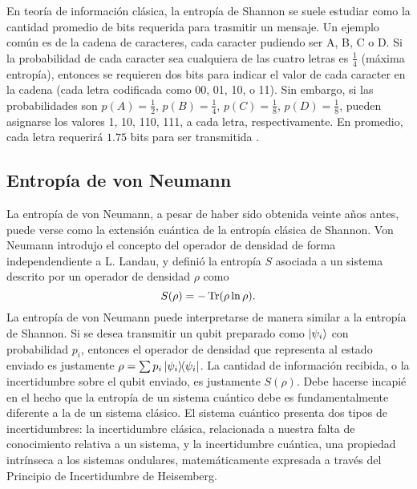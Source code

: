 En teoría de información clásica, la entropía de Shannon se suele estudiar como la cantidad promedio de bits requerida para trasmitir un mensaje. Un ejemplo común es de la cadena de caracteres, cada caracter pudiendo ser A, B, C o D. Si la probabilidad de cada caracter sea cualquiera de las cuatro letras es $\frac{1}{4}$ (máxima entropía), entonces se requieren dos bits para indicar el valor de cada caracter en la cadena (cada letra codificada como 00, 01, 10, o 11). Sin embargo, si las probabilidades son $p(A)=\frac{1}{2}$, $p(B)=\frac{1}{4}$, $p(C)=\frac{1}{8}$, $p(D)=\frac{1}{8}$, pueden asignarse los valores 1, 10, 110, 111, a cada letra, respectivamente. En promedio, cada letra requerirá $1.75$ bits para ser transmitida \cite{Chuang}. 

\subsection{Entropía de von Neumann}

La entropía de von Neumann, a pesar de haber sido obtenida veinte años antes, puede verse como la extensión cuántica de la entropía clásica de Shannon. Von Neumann introdujo el concepto del operador de densidad de forma independendiente a L. Landau, y definió la entropía $S$ asociada a un sistema descrito por un operador de densidad $\rho$ como \cite{vonNeumann}
\begin{equation}\label{eq:VonNeumannEntropy}
    S(\rho)=-\Tr(\rho\ln{\rho}).
\end{equation}
La entropía de von Neumann puede interpretarse de manera similar a la entropía de Shannon. Si se desea transmitir un qubit preparado como $\ket{\psi_{i}}$ con probabilidad $p_{i}$, entonces el operador de densidad que representa al estado enviado es justamente $\rho=\sum p_{i}\dyad{\psi_{i}}$. La cantidad de información recibida, o la incertidumbre sobre el qubit enviado, es justamente $S(\rho)$. Debe hacerse incapié en el hecho que la entropía de un sistema cuántico debe es fundamentalmente diferente a la de un sistema clásico. El sistema cuántico presenta dos tipos de incertidumbres: la incertidumbre clásica, relacionada a nuestra falta de conocimiento relativa a un sistema, y la incertidumbre cuántica, una propiedad intrínseca a los sistemas ondulares, matemáticamente expresada a través del Principio de Incertidumbre de Heisemberg\cite{Wilde}.

